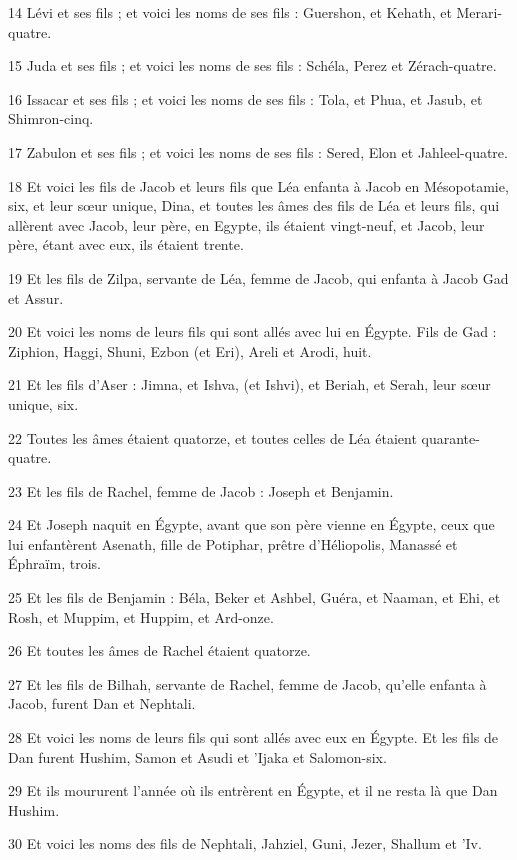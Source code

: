 \par 14 Lévi et ses fils ; et voici les noms de ses fils : Guershon, et Kehath, et Merari-quatre.
\par 15 Juda et ses fils ; et voici les noms de ses fils : Schéla, Perez et Zérach-quatre.
\par 16 Issacar et ses fils ; et voici les noms de ses fils : Tola, et Phua, et Jasub, et Shimron-cinq.
\par 17 Zabulon et ses fils ; et voici les noms de ses fils : Sered, Elon et Jahleel-quatre.
\par 18 Et voici les fils de Jacob et leurs fils que Léa enfanta à Jacob en Mésopotamie, six, et leur sœur unique, Dina, et toutes les âmes des fils de Léa et leurs fils, qui allèrent avec Jacob, leur père, en Egypte, ils étaient vingt-neuf, et Jacob, leur père, étant avec eux, ils étaient trente.
\par 19 Et les fils de Zilpa, servante de Léa, femme de Jacob, qui enfanta à Jacob Gad et Assur.
\par 20 Et voici les noms de leurs fils qui sont allés avec lui en Égypte. Fils de Gad : Ziphion, Haggi, Shuni, Ezbon (et Eri), Areli et Arodi, huit.
\par 21 Et les fils d'Aser : Jimna, et Ishva, (et Ishvi), et Beriah, et Serah, leur sœur unique, six.
\par 22 Toutes les âmes étaient quatorze, et toutes celles de Léa étaient quarante-quatre.
\par 23 Et les fils de Rachel, femme de Jacob : Joseph et Benjamin.
\par 24 Et Joseph naquit en Égypte, avant que son père vienne en Égypte, ceux que lui enfantèrent Asenath, fille de Potiphar, prêtre d'Héliopolis, Manassé et Éphraïm, trois.
\par 25 Et les fils de Benjamin : Béla, Beker et Ashbel, Guéra, et Naaman, et Ehi, et Rosh, et Muppim, et Huppim, et Ard-onze.
\par 26 Et toutes les âmes de Rachel étaient quatorze.
\par 27 Et les fils de Bilhah, servante de Rachel, femme de Jacob, qu'elle enfanta à Jacob, furent Dan et Nephtali.
\par 28 Et voici les noms de leurs fils qui sont allés avec eux en Égypte. Et les fils de Dan furent Hushim, Samon et Asudi et 'Ijaka et Salomon-six.
\par 29 Et ils moururent l'année où ils entrèrent en Égypte, et il ne resta là que Dan Hushim.
\par 30 Et voici les noms des fils de Nephtali, Jahziel, Guni, Jezer, Shallum et 'Iv.
